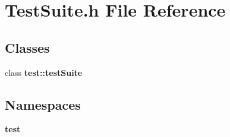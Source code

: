 \section{Test\+Suite.\+h File Reference}
\label{TestSuite_8h}
\subsection*{Classes}
\begin{DoxyCompactItemize}
\item 
class {\bf test\+::test\+Suite}
\end{DoxyCompactItemize}
\subsection*{Namespaces}
\begin{DoxyCompactItemize}
\item 
 {\bf test}
\end{DoxyCompactItemize}
